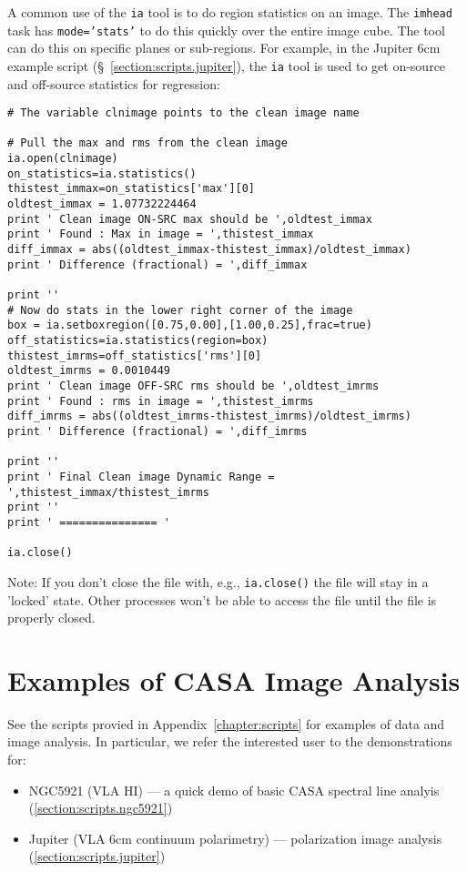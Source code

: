 A common use of the {\tt ia} tool is to do region statistics on
an image.  The {\tt imhead} task has {\tt mode='stats'} to do
this quickly over the entire image cube.  The tool can do this
on specific planes or sub-regions.  For example, in the Jupiter
6cm example script (\S~\ref{section:scripts.jupiter}), 
the {\tt ia} tool is used to get on-source and off-source statistics
for regression:
\small
\begin{verbatim}
# The variable clnimage points to the clean image name

# Pull the max and rms from the clean image
ia.open(clnimage)
on_statistics=ia.statistics()
thistest_immax=on_statistics['max'][0]
oldtest_immax = 1.07732224464
print ' Clean image ON-SRC max should be ',oldtest_immax
print ' Found : Max in image = ',thistest_immax
diff_immax = abs((oldtest_immax-thistest_immax)/oldtest_immax)
print ' Difference (fractional) = ',diff_immax

print ''
# Now do stats in the lower right corner of the image
box = ia.setboxregion([0.75,0.00],[1.00,0.25],frac=true)
off_statistics=ia.statistics(region=box)
thistest_imrms=off_statistics['rms'][0]
oldtest_imrms = 0.0010449
print ' Clean image OFF-SRC rms should be ',oldtest_imrms
print ' Found : rms in image = ',thistest_imrms
diff_imrms = abs((oldtest_imrms-thistest_imrms)/oldtest_imrms)
print ' Difference (fractional) = ',diff_imrms

print ''
print ' Final Clean image Dynamic Range = ',thistest_immax/thistest_imrms
print ''
print ' =============== '

ia.close()

\end{verbatim}
\normalsize

Note: If you don't close the file with, e.g., {\tt ia.close()} the
file will stay in a 'locked' state. Other processes won't be able to
access the file until the file is properly closed. 

\section{Examples of CASA Image Analysis}
\label{section:analysis.examples}

See the scripts provied in Appendix~\ref{chapter:scripts} for examples of
data and image analysis.  In particular, we refer
the interested user to the demonstrations for:
\begin{itemize}
\item NGC5921 (VLA HI) --- a quick demo of basic CASA spectral line analyis
      (\ref{section:scripts.ngc5921})
\item Jupiter (VLA 6cm continuum polarimetry) --- polarization image analysis
      (\ref{section:scripts.jupiter})
\end{itemize}

